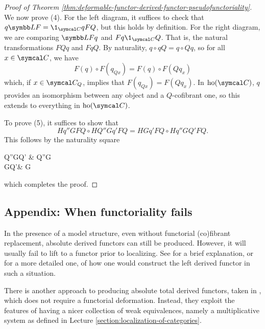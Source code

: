 \begin{proof}[Proof of Theorem \ref{thm:deformable-functor-derived-functor-pseudofunctoriality}]
We now prove (4). For the left diagram, it suffices to check that \( q \bbL F = \1_{\calC} q FQ \), but this holds by definition. For the right diagram, we are comparing
\(\bbL Fq\) and \(Fq\1_{\calC} Q\). That is, the natural transformations \(FQq\) and \(FqQ\). By naturality, \(q\circ qQ = q\circ Qq\), so for all \(x\in\calC\), we have
\[ F(q)\circ F(q_{Qx}) = F(q)\circ F(Qq_x) \]
which, if \(x\in\calC_Q\), implies that \(F(q_{Qx}) = F(Qq_x)\). In \(\ho(\calC)\), \(q\) provides an isomorphism between any object and a \(Q\)-cofibrant one, so this extends to everything in \(\ho(\calC)\).

To prove (5), it suffices to show that
\[ Hq''GFQ \circ HQ'' Gq'FQ = HGq'FQ\circ Hq''GQ'FQ. \]
This follows by the naturality square
\begin{diagram*}
	Q''GQ' \ar[r,Rightarrow,"Q''Gq'"]\ar[d,Rightarrow,"q''GQ'"'] & Q''G \ar[d,Rightarrow,"q''G"] \\
	GQ'\ar[r,Rightarrow,"Gq'"'] & G
\end{diagram*}
which completes the proof.
\end{proof}


\subsection{Appendix: When functoriality fails}

\begin{remark}
	In the presence of a model structure, even without functorial (co)fibrant replacement, absolute derived functors can still be produced. However, it will usually fail to lift to a functor prior to localizing.
	See \cite{426439} for a brief explanation, or \cite{cisinski-book} for a more detailed one, of how one would construct the left derived functor in such a situation.
\end{remark}

There is another approach to producing absolute total derived functors, taken in \cite{kashiwara-schapira-book}, which does not require a functorial deformation.
Instead, they exploit the features of having a nicer collection of weak equivalences, namely a multiplicative system as defined in Lecture \ref{section:localization-of-categories}.

